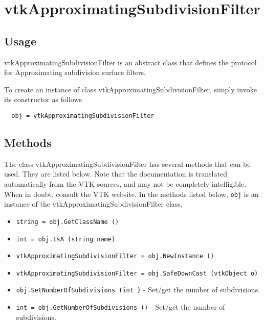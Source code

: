 \section{vtkApproximatingSubdivisionFilter}

\subsection{Usage}

 vtkApproximatingSubdivisionFilter is an abstract class that defines
 the protocol for Approximating subdivision surface filters.

To create an instance of class vtkApproximatingSubdivisionFilter, simply
invoke its constructor as follows
\begin{verbatim}
  obj = vtkApproximatingSubdivisionFilter
\end{verbatim}
\subsection{Methods}

The class vtkApproximatingSubdivisionFilter has several methods that can be used.
  They are listed below.
Note that the documentation is translated automatically from the VTK sources,
and may not be completely intelligible.  When in doubt, consult the VTK website.
In the methods listed below, \verb|obj| is an instance of the vtkApproximatingSubdivisionFilter class.
\begin{itemize}
\item  \verb|string = obj.GetClassName ()|

\item  \verb|int = obj.IsA (string name)|

\item  \verb|vtkApproximatingSubdivisionFilter = obj.NewInstance ()|

\item  \verb|vtkApproximatingSubdivisionFilter = obj.SafeDownCast (vtkObject o)|

\item  \verb|obj.SetNumberOfSubdivisions (int )| -  Set/get the number of subdivisions.

\item  \verb|int = obj.GetNumberOfSubdivisions ()| -  Set/get the number of subdivisions.

\end{itemize}
